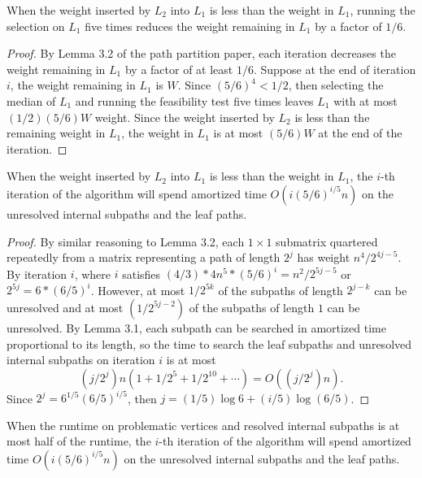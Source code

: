 \documentclass[12pt]{article}
\begin{document}
\begin{spacing}{3}
\newpage\noindent
\begin{theorem}
When the weight inserted by $L_2$ into $L_1$ is less than the weight in $L_1$, running the selection on $L_1$ five times reduces the weight remaining in $L_1$ by a factor of $1/6$.
\end{theorem}
\begin{proof}
By Lemma 3.2 of the path partition paper, each iteration decreases the weight remaining in $L_1$ by a factor of at least $1/6$. Suppose at the end of iteration $i$, the weight remaining in $L_1$ is $W$. Since $(5/6)^4<1/2$, then selecting the median of $L_1$ and running the feasibility test five times leaves $L_1$ with at most $(1/2)(5/6)W$ weight. Since the weight inserted by $L_2$ is less than the remaining weight in $L_1$, the weight in $L_1$ is at most $(5/6)W$ at the end of the iteration.
\end{proof}
\begin{theorem}
When the weight inserted by $L_2$ into $L_1$ is less than the weight in $L_1$, the $i$-th iteration of the algorithm will spend amortized time $O(i(5/6)^{i/5}n)$ on the unresolved internal subpaths and the leaf paths.
\end{theorem}
\begin{proof}
By similar reasoning to Lemma 3.2, each $1\times1$ submatrix quartered repeatedly from a matrix representing a path of length $2^j$ has weight $n^4/2^{4j-5}$. By iteration $i$, where $i$ satisfies $(4/3)*4n^5*(5/6)^i=n^2/2^{5j-5}$ or $2^{5j}=6*(6/5)^i$. However, at most $1/2^{5k}$ of the subpaths of length $2^{j-k}$ can be unresolved and at most $(1/2^{5j-2})$ of the subpaths of length $1$ can be unresolved. By Lemma 3.1, each subpath can be searched in amortized time proportional to its length, so the time to search the leaf subpaths and unresolved internal subpaths on iteration $i$ is at most
\[(j/2^j)n(1+1/2^5+1/2^{10}+\cdots)=O((j/2^j)n).\]
Since $2^j=6^{1/5}(6/5)^{i/5}$, then $j=(1/5)\log 6+(i/5)\log(6/5)$.
\end{proof}
\begin{corollary}
When the runtime on problematic vertices and resolved internal subpaths is at most half of the runtime, the $i$-th iteration of the algorithm will spend amortized time $O(i(5/6)^{i/5}n)$ on the unresolved internal subpaths and the leaf paths.
\end{corollary}


\end{spacing}
\end{document}
